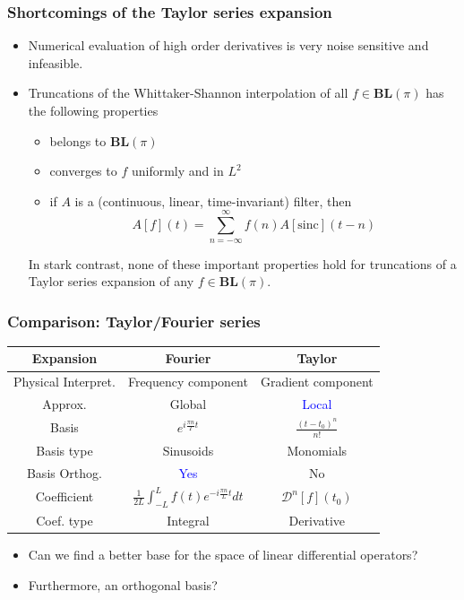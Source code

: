 \documentclass{beamer}
\begin{document}

\begin{frame}
\frametitle{Shortcomings of the Taylor series expansion}
\begin{itemize}
	\item Numerical evaluation of high order derivatives is \alert{very noise
		sensitive and infeasible.}
	\item Truncations of the Whittaker-Shannon interpolation of all 
		$f \in \mathbf{BL}(\pi)$ has the following properties
		\begin{itemize}
			\item belongs to $\mathbf{BL}(\pi)$
			\item converges to $f$ uniformly and in $L^2$
			\item if $A$ is a (continuous, linear, time-invariant) filter, then
				\begin{equation} \label{eqn:filter_prop}
					A[f](t) = \sum_{n=-\infty}^{\infty} f(n) A[\mathrm{sinc}](t-n)
				\end{equation}
		\end{itemize}
		In stark contrast, \alert{none of these important properties hold} for
		truncations of a Taylor series expansion of any $f \in \mathbf{BL}(\pi)$.
\end{itemize}
\end{frame}


\begin{frame}
\frametitle{Comparison: Taylor/Fourier series}
\begin{table}
\begin{tabular}{c c c}
\toprule
Expansion & \textbf{Fourier} & \textbf{Taylor}\\
\midrule
Physical Interpret. & Frequency component & Gradient component \\
Approx. & Global & \textcolor{blue}{Local} \\
Basis			& $e^{i \frac{\pi n}{T} t}$ & $\frac{(t-t_0)^n}{n!}$ \\
Basis type 		 & Sinusoids & Monomials \\
Basis Orthog.& \textcolor{blue}{Yes} & \alert{No} \\
Coefficient & $\frac{1}{2L} \int_{-L}^{L} f(t) e^{-i \frac{\pi n}{L} t} dt$ & $\mathcal{D}^n[f](t_0)$ \\
Coef. type  & Integral & \alert{Derivative} \\
\bottomrule
\end{tabular}
\end{table}

\begin{itemize}
	\item Can we find a better base for the space of linear differential operators?
	\item Furthermore, an \alert{orthogonal basis}?
\end{itemize}
\end{frame}
\end{document}
